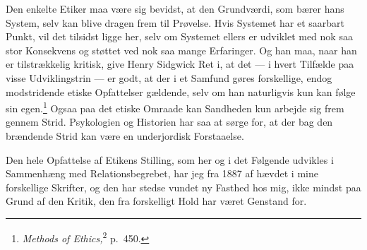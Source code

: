 \documentclass[12pt]{article}
\newcommand{\opage}[1]{\marginnote{\footnotesize\textit{[#1]}}}
\begin{document}
Den enkelte Etiker maa være sig bevidst, at den Grundværdi, som bærer
hans System, selv kan blive dragen frem til Prøvelse. Hvis Systemet har
et saarbart Punkt, vil det tilsidst ligge her, selv om Systemet ellers
er udviklet med nok saa stor Konsekvens og støttet ved nok saa mange
Erfaringer. Og han maa, naar han er tilstrækkelig kritisk, give Henry
Sidgwick Ret i, at det --- i hvert Tilfælde paa visse Udviklingstrin ---
er godt, at der i et Samfund gøres forskellige, endog modstridende
etiske Opfattelser gældende, selv om han naturligvis kun kan følge sin
egen.\footnote{\textit{Methods of Ethics,}\textsuperscript{2} p.~450.}
Ogsaa paa det etiske Omraade kan Sandheden kun arbejde sig frem gennem
Strid. Psykologien og Historien har saa at
\opage{87} sørge for, at der bag den brændende Strid kan være en underjordisk
Forstaaelse.

Den hele Opfattelse af Etikens Stilling, som her og i det Følgende
udvikles i Sammenhæng med Relationsbegrebet, har jeg fra 1887 af hævdet
i mine forskellige Skrifter, og den har stedse vundet ny Fasthed hos
mig, ikke mindst paa Grund af den Kritik, den fra forskelligt Hold har
været Genstand for.
\end{document}

